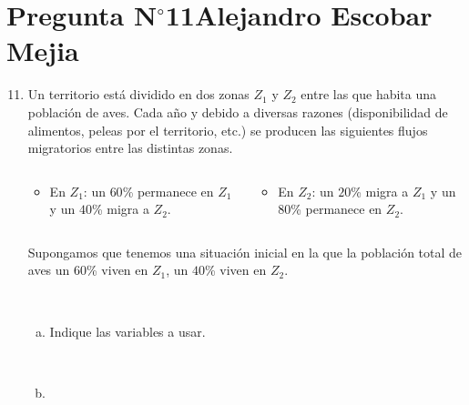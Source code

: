 \section{Pregunta N$^{\circ}$11\qquad Alejandro Escobar Mejia}

\begin{frame}
	\begin{enumerate}\setcounter{enumi}{10}
		\item

		      Un territorio está dividido en dos zonas $Z_{1}$ y $Z_{2}$
		      entre las que habita una población de aves.
		      Cada año y debido a diversas razones (disponibilidad de
		      alimentos, peleas por el territorio, etc.) se producen
		      las siguientes flujos migratorios entre las distintas
		      zonas.

		      \begin{columns}
			      \begin{column}{0.48\textwidth}
				      \begin{itemize}
					      \item

					            En $Z_{1}$: un $60$\% permanece en $Z_{1}$ y un
					            $40$\% migra a $Z_{2}$.
				      \end{itemize}
			      \end{column}
			      \begin{column}{0.48\textwidth}
				      \begin{itemize}
					      \item

					            En $Z_{2}$: un $20$\% migra a $Z_{1}$ y un
					            $80$\% permanece en $Z_{2}$.
				      \end{itemize}
			      \end{column}
		      \end{columns}

		      Supongamos que tenemos una situación inicial en la que la
		      población total de aves un $60$\% viven en $Z_{1}$, un
		      $40$\% viven en $Z_{2}$.

		      \

		      \begin{enumerate}[a)]
			      \item

			            Indique las variables a usar.

			            \

			      \item


\end{enumerate}
\end{enumerate}
\end{frame}
